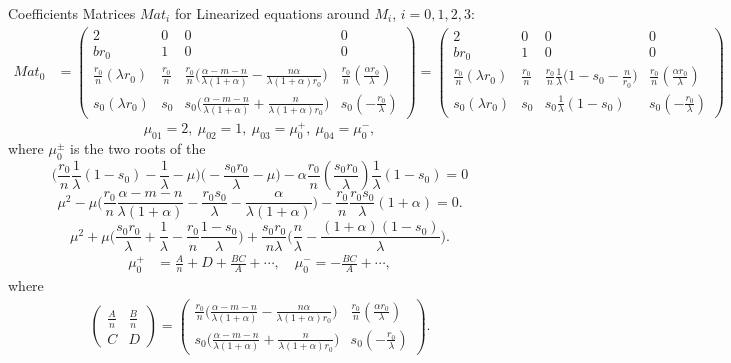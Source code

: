 \documentclass[a4paper,11pt]{article}
\begin{document}
Coefficients Matrices $Mat_i$ for Linearized equations around $M_i$, $i=0,1,2,3$: 
\begin{align*}
 Mat_0 &= \begin{pmatrix}
          2 & 0 & 0 & 0 \\
          br_0 & 1 & 0 & 0\\
          \frac{r_0}{n}(\lambda r_0) & \frac{r_0}{n} & \frac{r_0}{n}\Big(\frac{\alpha-m-n}{\lambda(1+\alpha)} - \frac{n\alpha}{\lambda(1+\alpha)r_0}\Big) & \frac{r_0}{n}(\frac{\alpha r_0}{\lambda})\\
          s_0(\lambda r_0) & s_0 & s_0\Big(\frac{\alpha-m-n}{\lambda(1+\alpha)} + \frac{n}{\lambda(1+\alpha)r_0}\Big) & s_0(-\frac{r_0}{\lambda})
         \end{pmatrix}
        =\begin{pmatrix}
          2 & 0 & 0 & 0 \\
          br_0 & 1 & 0 & 0\\
          \frac{r_0}{n}(\lambda r_0) & \frac{r_0}{n} & \frac{r_0}{n}\frac{1}{\lambda}\Big(1-s_0-\frac{n}{r_0}\Big) & \frac{r_0}{n}(\frac{\alpha r_0}{\lambda})\\
          s_0(\lambda r_0) & s_0 & s_0\frac{1}{\lambda}(1-s_0) & s_0(-\frac{r_0}{\lambda})
         \end{pmatrix}
\end{align*}
\begin{equation}
 \mu_{01}=2, \ \mu_{02}=1, \ \mu_{03}=\mu_0^+, \ \mu_{04}=\mu_0^-,
\end{equation}
where $\mu_0^\pm$ is the two roots of the 
$$ \Big(\frac{r_0}{n}\frac{1}{\lambda}(1-s_0)-\frac{1}{\lambda}-\mu \Big)\Big(-\frac{s_0r_0}{\lambda}-\mu\Big) - \alpha\frac{r_0}{n}(\frac{s_0 r_0}{\lambda})\frac{1}{\lambda}(1-s_0)=0$$
$$ \mu^2 - \mu\Big(\frac{r_0}{n}\frac{\alpha-m-n}{\lambda(1+\alpha)} - \frac{r_0s_0}{\lambda} - \frac{\alpha}{\lambda(1+\alpha)}\Big) - \frac{r_0}{n}\frac{r_0s_0}{\lambda}(1+\alpha) = 0.$$
$$ \mu^2 + \mu\Big(\frac{s_0r_0}{\lambda} + \frac{1}{\lambda}-\frac{r_0}{n}\frac{1-s_0}{\lambda}\Big) + \frac{s_0r_0}{n\lambda}\Big(\frac{n}{\lambda} - \frac{(1+\alpha)(1-s_0)}{\lambda}\Big).$$
\begin{align*}
 \mu_0^+ &= \frac{A}{n} + D + \frac{BC}{A} + \cdots, \quad \mu_0^- = - \frac{BC}{A} + \cdots,
\end{align*}
where
\begin{align*}
 \begin{pmatrix} \frac{A}{n} & \frac{B}{n} \\ C & D \end{pmatrix} = 
 \begin{pmatrix}
 \frac{r_0}{n}\Big(\frac{\alpha-m-n}{\lambda(1+\alpha)} - \frac{n\alpha}{\lambda(1+\alpha)r_0}\Big) & \frac{r_0}{n}(\frac{\alpha r_0}{\lambda})\\
 s_0\Big(\frac{\alpha-m-n}{\lambda(1+\alpha)} + \frac{n}{\lambda(1+\alpha)r_0}\Big) & s_0(-\frac{r_0}{\lambda})
 \end{pmatrix}.
\end{align*}
\end{document}
